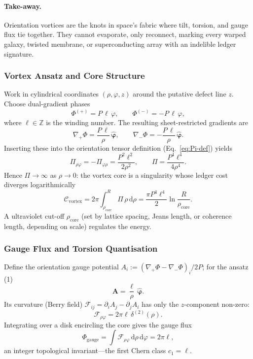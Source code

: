 \documentclass[11pt,oneside]{book}
\begin{document}
\paragraph{Take-away.}
Orientation vortices are the knots in space’s fabric where tilt,
torsion, and gauge flux tie together.  They cannot evaporate, only
reconnect, marking every warped galaxy, twisted membrane, or
superconducting array with an indelible ledger signature.



\subsubsection{Vortex Ansatz and Core Structure}
\label{ss:vortex-ansatz}

Work in cylindrical coordinates $(\rho,\varphi,z)$ around the putative
defect line $z$.
Choose dual-gradient phases
\[
   \Phi^{(+)} = P\,\ell\,\varphi,
   \qquad
   \Phi^{(-)} = -P\,\ell\,\varphi,
   \tag{1}
\]
where $\ell\in\mathbb Z$ is the winding number.  The resulting
sheet-restricted gradients are
\[
   \nabla_{+}\Phi = \frac{P\,\ell}{\rho}\,\hat{\boldsymbol\varphi},
   \qquad
   \nabla_{-}\Phi = -\frac{P\,\ell}{\rho}\,\hat{\boldsymbol\varphi}.
\]
Inserting these into the orientation tensor definition
(Eq.~\eqref{eq:Pi-def}) yields
\[
   \Pi_{\rho\varphi}
   = -\Pi_{\varphi\rho}
   = \frac{P^{2}\ell^{2}}{2\rho^{2}},
   \qquad
   \Pi = \frac{P^{4}\ell^{4}}{4\rho^{4}}.
   \tag{2}
\]
Hence $\Pi\!\to\!\infty$ as $\rho\!\to\!0$: the vortex core is a
singularity whose ledger cost diverges logarithmically
\[
   \mathcal C_{\text{vortex}}
   = 2\pi \int_{\rho_{\text{core}}}^{R}
       \Pi\,\rho\,\mathrm d\rho
   = \frac{\pi P^{4}\ell^{4}}{2}
     \ln\!\frac{R}{\rho_{\text{core}}}.
   \tag{3}
\]
A ultraviolet cut-off $\rho_{\text{core}}$ (set by lattice spacing,
Jeans length, or coherence length, depending on scale) regulates the
energy.

\subsubsection{Gauge Flux and Torsion Quantisation}
\label{ss:vortex-flux}

Define the orientation gauge potential
$A_{i}:= (\nabla_{+}\Phi - \nabla_{-}\Phi)_{i}/2P$;
for the ansatz (1)
\[
   \mathbf A
   = \frac{\ell}{\rho}\,\hat{\boldsymbol\varphi}.
\]
Its curvature (Berry field)
$\mathcal F_{ij} = \partial_{i}A_{j}-\partial_{j}A_{i}$
has only the $z$-component non-zero:
\[
   \mathcal F_{\rho\varphi}
   = 2\pi\ell\,\delta^{(2)}(\rho).
\]
Integrating over a disk encircling the core gives the gauge flux
\[
   \Phi_{\text{gauge}}
   = \int\!\mathcal F_{\rho\varphi}\,
     \mathrm d\rho\,\mathrm d\varphi
   = 2\pi\ell,
   \tag{4}
\]
an integer topological invariant––the first Chern class $c_{1}=\ell$.
\end{document}
